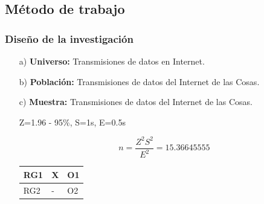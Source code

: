     \subsection{Método de trabajo}    
            \subsubsection{Diseño de la investigación}
                \begin{enumerate}   
                    \item[a)]{\bf Universo:} Transmisiones de datos en Internet.\par
                    \item[b)]{\bf Población:} Transmisiones de datos del Internet de las Cosas.\par
                    \item[c)]{\bf Muestra:} Transmisiones de datos del Internet de las Cosas.\par
                        Z=1.96 - 95\%, S=1s, E=0.5s\par
                        \begin{equation*}\label{}
                            n = \frac{Z^{2}S^{2}}{E^{2}} = 15.36645555
                        \end{equation*}
                        \begin{table}[h!]
                            \centering
                            \begin{tabular}{|p{1cm}|p{1cm}|p{1cm}|} \hline
            
                            RG1 &
                            X &
                            O1 
            
                            \\ \hline

                            RG2 &
                            - &
                            O2 
            

\end{tabular}
\end{table}
\end{enumerate}
